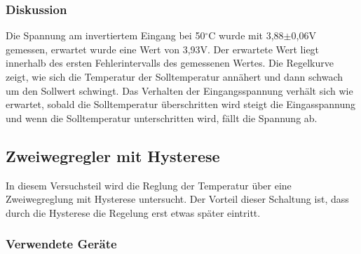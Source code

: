 \documentclass[12pt,a4paper]{article}
\begin{document}
\subsubsection*{Diskussion}
Die Spannung am invertiertem Eingang bei 50$^\circ$C wurde mit 3,88$\pm$0,06V gemessen, erwartet wurde eine Wert von 3,93V. Der erwartete Wert liegt innerhalb des ersten Fehlerintervalls des gemessenen Wertes. Die Regelkurve zeigt, wie sich die Temperatur der Solltemperatur annähert und dann schwach um den Sollwert schwingt. Das Verhalten der Eingangsspannung verhält sich wie erwartet, sobald die Solltemperatur überschritten wird steigt die Eingasspannung und wenn die Solltemperatur unterschritten wird, fällt die Spannung ab.



\subsection{Zweiwegregler mit Hysterese}

In diesem Versuchsteil wird die Reglung der Temperatur über eine Zweiwegreglung mit Hysterese untersucht. Der Vorteil dieser Schaltung ist, dass durch die Hysterese die Regelung erst etwas später eintritt.

\subsubsection*{Verwendete Geräte}
\end{document}
